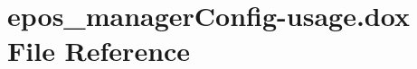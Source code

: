 \section{epos\-\_\-manager\-Config-\/usage.dox \-File \-Reference}
\label{epos__managerConfig-usage_8dox}
